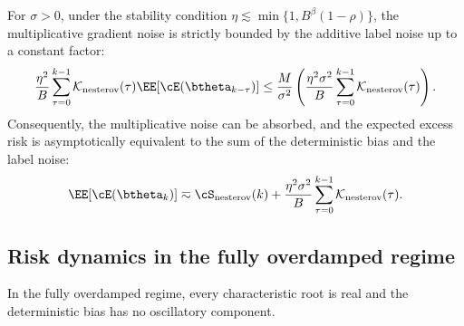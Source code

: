 \documentclass[11pt]{article}
\newcommand{\nesterov}{\mathrm{nesterov}}
\begin{document}
\begin{corollary}
\label{cor:nes_noise_absorption}
For $\sigma > 0$, under the stability condition $\eta \lesssim \min\{1, B^\beta (1-\rho)\}$, the multiplicative gradient noise is strictly bounded by the additive label noise up to a constant factor:
\[
    \frac{\eta^2}{B}\sum_{\tau=0}^{k-1}\mathcal{K}_{\nesterov}(\tau)\EE[\cE(\btheta_{k-\tau})] \le \frac{M}{\sigma^2} \left( \frac{\eta^2\sigma^2}{B}\sum_{\tau=0}^{k-1}\mathcal{K}_{\nesterov}(\tau) \right).
\]
Consequently, the multiplicative noise can be absorbed, and the expected excess risk is asymptotically equivalent to the sum of the deterministic bias and the label noise:
\[
    \EE[\cE(\btheta_k)] \eqsim \cS_{\nesterov}(k) + \frac{\eta^2\sigma^2}{B}\sum_{\tau=0}^{k-1}\mathcal{K}_{\nesterov}(\tau).
\]
\end{corollary}


\subsection{Risk dynamics in the fully overdamped regime}
\label{app:nes_fully_overdamped_loss}

In the fully overdamped regime, every characteristic root is real and the deterministic bias has no oscillatory component.
\end{document}
